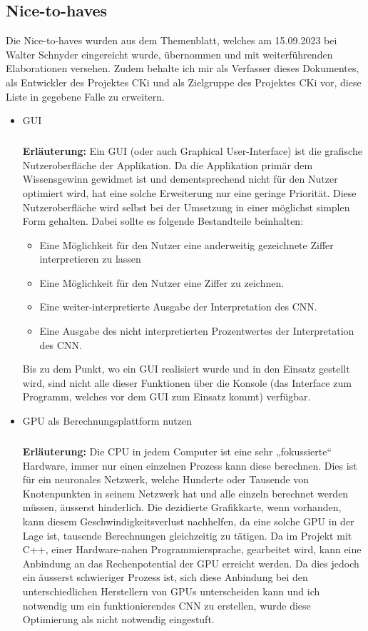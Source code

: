 \subsection{Nice-to-haves}
\label{sec:AnalyseNiceToHaveS}
Die Nice-to-haves wurden aus dem Themenblatt, welches am 15.09.2023 bei Walter Schnyder eingereicht wurde, übernommen und mit weiterführenden Elaborationen versehen. Zudem behalte ich mir als Verfasser dieses Dokumentes, als Entwickler des Projektes CKi und als Zielgruppe des Projektes CKi vor, diese Liste in gegebene Falle zu erweitern.

\begin{itemize}
\item GUI
\subparagraph{}
\textbf{Erläuterung:}
Ein GUI (oder auch Graphical User-Interface) ist die grafische Nutzeroberfläche der Applikation. Da die Applikation primär dem Wissensgewinn gewidmet ist und dementsprechend nicht für den Nutzer optimiert wird, hat eine solche Erweiterung nur eine geringe Priorität. Diese Nutzeroberfläche wird selbst bei der Umsetzung in einer möglichst simplen Form gehalten. Dabei sollte es folgende Bestandteile beinhalten:
\begin{itemize}
\item Eine Möglichkeit für den Nutzer eine anderweitig gezeichnete Ziffer interpretieren zu lassen
\item Eine Möglichkeit für den Nutzer eine Ziffer zu zeichnen.
\item Eine weiter-interpretierte Ausgabe der Interpretation des CNN.
\item Eine Ausgabe des nicht interpretierten Prozentwertes der Interpretation des CNN.
\end{itemize}
Bis zu dem Punkt, wo ein GUI realisiert wurde und in den Einsatz gestellt wird, sind nicht alle dieser Funktionen über die Konsole (das Interface zum Programm, welches vor dem GUI zum Einsatz kommt) verfügbar.

\item GPU als Berechnungsplattform nutzen
\subparagraph{}
\textbf{Erläuterung:}
Die CPU in jedem Computer ist eine sehr „fokussierte“ Hardware, immer nur einen einzelnen Prozess kann diese berechnen. Dies ist für ein neuronales Netzwerk, welche Hunderte oder Tausende von Knotenpunkten in seinem Netzwerk hat und alle einzeln berechnet werden müssen, äusserst hinderlich. Die dezidierte Grafikkarte, wenn vorhanden, kann diesem Geschwindigkeitsverlust nachhelfen, da eine solche GPU in der Lage ist, tausende Berechnungen gleichzeitig zu tätigen.
Da im Projekt mit C++, einer Hardware-nahen Programmiersprache, gearbeitet wird, kann eine Anbindung an das Rechenpotential der GPU erreicht werden. Da dies jedoch ein äusserst schwieriger Prozess ist, sich diese Anbindung bei den unterschiedlichen Herstellern von GPUs unterscheiden kann und ich notwendig um ein funktionierendes CNN zu erstellen, wurde diese Optimierung als nicht notwendig eingestuft.
\end{itemize}

